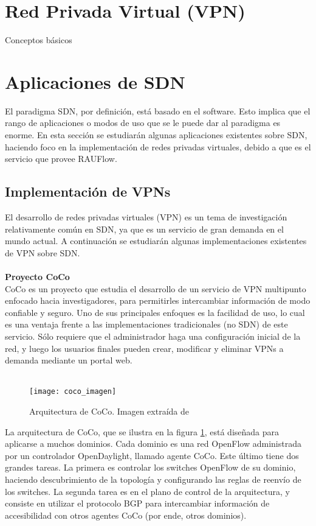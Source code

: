 \section{Red Privada Virtual (VPN)}
Conceptos básicos

\section{Aplicaciones de SDN}
El paradigma SDN, por definición, está basado en el software. Esto implica que el rango de aplicaciones o modos de uso que se le puede dar al paradigma es enorme. En esta sección se estudiarán algunas aplicaciones existentes sobre SDN, haciendo foco en la implementación de redes privadas virtuales, debido a que es el servicio que provee RAUFlow.
\subsection{Implementación de VPNs}
El desarrollo de redes privadas virtuales (VPN) es un tema de investigación relativamente común en SDN, ya que es un servicio de gran demanda en el mundo actual. A continuación se estudiarán algunas implementaciones existentes de VPN sobre SDN. \\ \\
\textbf{Proyecto CoCo} \\
CoCo \cite{coco-paper} es un proyecto que estudia el desarrollo de un servicio de VPN multipunto enfocado hacia investigadores, para permitirles intercambiar información de modo confiable y seguro. Uno de sus principales enfoques es la facilidad de uso, lo cual es una ventaja frente a las implementaciones tradicionales (no SDN) de este servicio. Sólo requiere que el administrador haga una configuración inicial de la red, y luego los usuarios finales pueden crear, modificar y  eliminar VPNs a demanda mediante un portal web. \\ \\
\begin{figure}[t]
	\caption{Arquitectura de CoCo. Imagen extraída de \cite{coco-paper}}
	\texttt{[image: coco\_imagen]}
	\centering
	\label{fig:coco_imagen}
\end{figure}
La arquitectura de CoCo, que se ilustra en la figura \ref{fig:coco_imagen}, está diseñada para aplicarse a muchos dominios. Cada dominio es una red OpenFlow administrada por un controlador OpenDaylight, llamado agente CoCo. Este último tiene dos grandes tareas. La primera es controlar los switches OpenFlow de su dominio, haciendo descubrimiento de la topología y configurando las reglas de reenvío de los switches. La segunda tarea es en el plano de control de la arquitectura, y consiste en utilizar el protocolo BGP para intercambiar información de accesibilidad con otros agentes CoCo (por ende, otros dominios). \\ \\
